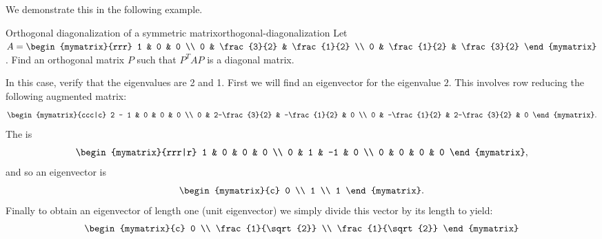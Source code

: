 We demonstrate this in the following example.

\begin{example}{Orthogonal diagonalization of a symmetric matrix}{orthogonal-diagonalization}
  Let $\def\arraystretch{1.2}A=\begin{mymatrix}{rrr}
    1 & 0 & 0 \\
    0 & \frac{3}{2} & \frac{1}{2} \\
    0 & \frac{1}{2} & \frac{3}{2}
  \end{mymatrix}$.  Find an orthogonal matrix $P$ such that $P^{T}AP$
  is a diagonal matrix.
\end{example}

\begin{solution}
  In this case, verify that the eigenvalues are 2 and 1. First we will
  find an eigenvector for the eigenvalue $2$. This involves row
  reducing the following augmented matrix:
  \begin{equation*}
    \def\arraystretch{1.2}
    \begin{mymatrix}{ccc|c}
      2 - 1 & 0 & 0 & 0 \\
      0 & 2-\frac{3}{2} & -\frac{1}{2} & 0 \\
      0 & -\frac{1}{2} & 2-\frac{3}{2} & 0
    \end{mymatrix}.
  \end{equation*}
  The {\rref} is
  \begin{equation*}
    \begin{mymatrix}{rrr|r}
      1 & 0 & 0 & 0 \\
      0 & 1 & -1 & 0 \\
      0 & 0 & 0 & 0
    \end{mymatrix},
  \end{equation*}
  and so an eigenvector is
  \begin{equation*}
    \begin{mymatrix}{c}
      0 \\
      1 \\
      1
    \end{mymatrix}.
  \end{equation*}
  Finally to obtain an eigenvector of length one (unit eigenvector) we
  simply divide this vector by its length to yield:
  \begin{equation*}
    \def\arraystretch{1.2}
    \begin{mymatrix}{c}
      0 \\
      \frac{1}{\sqrt{2}} \\
      \frac{1}{\sqrt{2}}

\end{mymatrix}
\end{equation*}
\end{solution}
